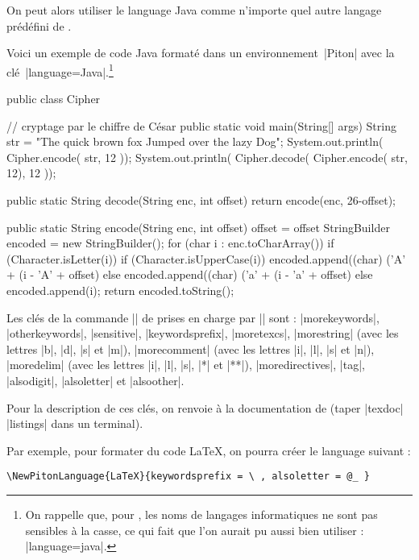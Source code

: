 \documentclass[dvipsnames,svgnames]{article}
\begin{document}
\medskip
On peut alors utiliser le language Java comme n'importe quel autre langage prédéfini de
.

Voici un exemple de code Java formaté dans un environnement~|{Piton}| avec la
clé~|language=Java|.\footnote{On rappelle que, pour , les noms de langages
  informatiques ne sont pas sensibles à la casse, ce qui fait que l'on aurait pu aussi
  bien utiliser : |language=java|.}

\bigskip
\begingroup
\small
{}
\begin{Piton}[language = Java]
public class Cipher { // cryptage par le chiffre de César
    public static void main(String[] args) {
        String str = "The quick brown fox Jumped over the lazy Dog";
        System.out.println( Cipher.encode( str, 12 ));
        System.out.println( Cipher.decode( Cipher.encode( str, 12), 12 ));
    }

    public static String decode(String enc, int offset) {
        return encode(enc, 26-offset);
    }

    public static String encode(String enc, int offset) {
        offset = offset %
        StringBuilder encoded = new StringBuilder();
        for (char i : enc.toCharArray()) {
            if (Character.isLetter(i)) {
                if (Character.isUpperCase(i)) {
                    encoded.append((char) ('A' + (i - 'A' + offset) %
                } else {
                    encoded.append((char) ('a' + (i - 'a' + offset) %
                }
            } else {
                encoded.append(i);
            }
        }
        return encoded.toString();
    }
}
\end{Piton}
\endgroup

\bigskip
Les clés de la commande |\lstdefinelanguage| de  prises en charge par
|\NewPitonLanguage| sont : |morekeywords|, |otherkeywords|, |sensitive|, |keywordsprefix|,
|moretexcs|, |morestring| (avec les lettres |b|, |d|, |s| et |m|), |morecomment| (avec les
lettres |i|, |l|, |s| et |n|), |moredelim| (avec les lettres |i|, |l|, |s|, |*| et |**|),
|moredirectives|, |tag|, |alsodigit|, |alsoletter| et |alsoother|.

Pour la description de ces clés, on renvoie à la documentation de  (taper
|texdoc| |listings| dans un terminal).

\bigskip
Par exemple, pour formater du code LaTeX, on pourra créer le language suivant : 
%
{\color{gray}
\begin{verbatim}
\NewPitonLanguage{LaTeX}{keywordsprefix = \ , alsoletter = @_ }
\end{verbatim}
} 
\end{document}
